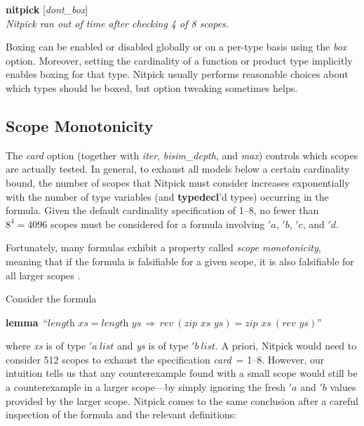 \documentclass[a4paper,12pt]{article}
\begin{document}
\prew
\textbf{nitpick} [\textit{dont\_box}] \\[2\smallskipamount]
{\slshape Nitpick ran out of time after checking 4 of 8 scopes.}
\postw

{
Boxing can be enabled or disabled globally or on a per-type basis using the
\textit{box} option. Moreover, setting the cardinality of a function or
product type implicitly enables boxing for that type. Nitpick usually performs
reasonable choices about which types should be boxed, but option tweaking
sometimes helps.

}

\subsection{Scope Monotonicity}
\label{scope-monotonicity}

The \textit{card} option (together with \textit{iter}, \textit{bisim\_depth},
and \textit{max}) controls which scopes are actually tested. In general, to
exhaust all models below a certain cardinality bound, the number of scopes that
Nitpick must consider increases exponentially with the number of type variables
(and \textbf{typedecl}'d types) occurring in the formula. Given the default
cardinality specification of 1--8, no fewer than $8^4 = 4096$ scopes must be
considered for a formula involving $'a$, $'b$, $'c$, and $'d$.

Fortunately, many formulas exhibit a property called \textsl{scope
monotonicity}, meaning that if the formula is falsifiable for a given scope,
it is also falsifiable for all larger scopes \cite[p.~165]{jackson-2006}.

Consider the formula

\prew
\textbf{lemma}~``$\textit{length~xs} = \textit{length~ys} \,\Longrightarrow\, \textit{rev}~(\textit{zip~xs~ys}) = \textit{zip~xs}~(\textit{rev~ys})$''
\postw

where \textit{xs} is of type $'a~\textit{list}$ and \textit{ys} is of type
$'b~\textit{list}$. A priori, Nitpick would need to consider 512 scopes to
exhaust the specification \textit{card}~= 1--8. However, our intuition tells us
that any counterexample found with a small scope would still be a counterexample
in a larger scope---by simply ignoring the fresh $'a$ and $'b$ values provided
by the larger scope. Nitpick comes to the same conclusion after a careful
inspection of the formula and the relevant definitions:
\end{document}
